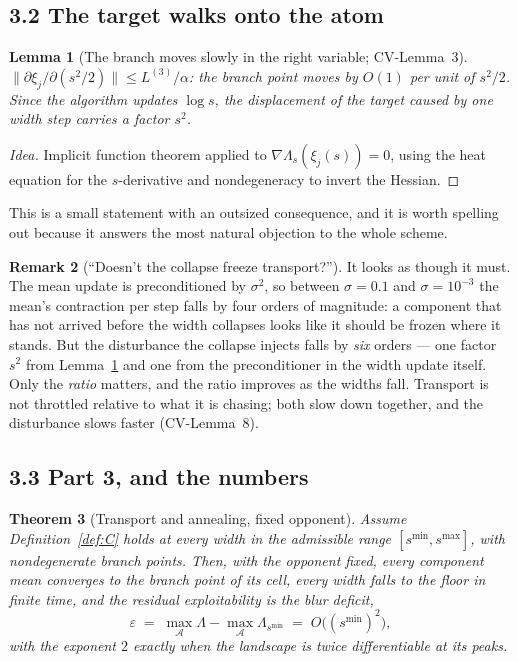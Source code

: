 \documentclass[11pt]{article}
\newtheorem{theorem}{Theorem}[section]
\newtheorem{lemma}[theorem]{Lemma}
\theoremstyle{definition}
\newtheorem{remark}[theorem]{Remark}
\newcommand{\cA}{\mathcal{A}}
\newcommand{\CV}[1]{\textsf{CV-#1}}
\begin{document}
\subsection*{3.2 The target walks onto the atom}

\begin{lemma}[The branch moves slowly in the right variable;
\CV{Lemma~3}]\label{lem:branch}
$\|\partial \xi_j / \partial (s^2/2)\| \le L^{(3)}/\alpha$: the branch point moves
by $O(1)$ per unit of $s^2/2$. Since the algorithm updates $\log s$, the
displacement of the target caused by one width step carries a factor $s^2$.
\end{lemma}

\begin{proof}[Idea]
Implicit function theorem applied to $\nabla \Lambda_s(\xi_j(s)) = 0$, using the
heat equation for the $s$-derivative and nondegeneracy to invert the Hessian.
\end{proof}

This is a small statement with an outsized consequence, and it is worth spelling
out because it answers the most natural objection to the whole scheme.

\begin{remark}[``Doesn't the collapse freeze transport?'']\label{rem:throttle}
It looks as though it must. The mean update is preconditioned by $\sigma^2$, so
between $\sigma = 0.1$ and $\sigma = 10^{-3}$ the mean's contraction per step
falls by four orders of magnitude: a component that has not arrived before the
width collapses looks like it should be frozen where it stands. But the
disturbance the collapse injects falls by \emph{six} orders --- one factor $s^2$
from Lemma~\ref{lem:branch} and one from the preconditioner in the width update
itself. Only the \emph{ratio} matters, and the ratio improves as the widths fall.
Transport is not throttled relative to what it is chasing; both slow down
together, and the disturbance slows faster (\CV{Lemma~8}).
\end{remark}

\subsection*{3.3 Part 3, and the numbers}

\begin{theorem}[Transport and annealing, fixed opponent]\label{thm:part3}
Assume Definition~\ref{def:C} holds at \emph{every} width in the admissible range
$[s^{\min}, s^{\max}]$, with nondegenerate branch points. Then, with the opponent
fixed, every component mean converges to the branch point of its cell, every
width falls to the floor in finite time, and the residual exploitability is the
blur deficit,
\[
  \varepsilon \;=\; \max_\cA \Lambda - \max_\cA \Lambda_{s^{\min}}
  \;=\; O\big((s^{\min})^2\big),
\]
with the exponent $2$ exactly when the landscape is twice differentiable at its
peaks.
\end{theorem}
\end{document}
